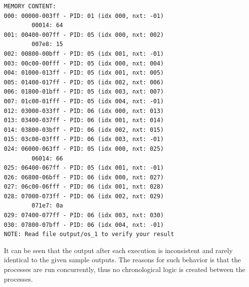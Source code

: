 \documentclass[a4paper]{article}
\numberwithin{equation}{section}
\begin{document}
\begin{mdframed}[leftline=false,rightline=false,backgroundcolor=teal!10,nobreak=false]
\begin{verbatim}
MEMORY CONTENT:
000: 00000-003ff - PID: 01 (idx 000, nxt: -01)
        00014: 64
001: 00400-007ff - PID: 05 (idx 000, nxt: 002)
        007e8: 15
002: 00800-00bff - PID: 05 (idx 001, nxt: -01)
003: 00c00-00fff - PID: 05 (idx 000, nxt: 004)
004: 01000-013ff - PID: 05 (idx 001, nxt: 005)
005: 01400-017ff - PID: 05 (idx 002, nxt: 006)
006: 01800-01bff - PID: 05 (idx 003, nxt: 007)
007: 01c00-01fff - PID: 05 (idx 004, nxt: -01)
012: 03000-033ff - PID: 06 (idx 000, nxt: 013)
013: 03400-037ff - PID: 06 (idx 001, nxt: 014)
014: 03800-03bff - PID: 06 (idx 002, nxt: 015)
015: 03c00-03fff - PID: 06 (idx 003, nxt: -01)
024: 06000-063ff - PID: 05 (idx 000, nxt: 025)
        06014: 66
025: 06400-067ff - PID: 05 (idx 001, nxt: -01)
026: 06800-06bff - PID: 06 (idx 000, nxt: 027)
027: 06c00-06fff - PID: 06 (idx 001, nxt: 028)
028: 07000-073ff - PID: 06 (idx 002, nxt: 029)
        071e7: 0a
029: 07400-077ff - PID: 06 (idx 003, nxt: 030)
030: 07800-07bff - PID: 06 (idx 004, nxt: -01)
NOTE: Read file output/os_1 to verify your result
  \end{verbatim}
\end{mdframed}

It can be seen that the output after each execution is inconsistent and rarely identical to the given sample outputs.
The reasons for such behavior is that the processes are run concurrently, thus no chronological logic is created between the processes.
\end{document}
